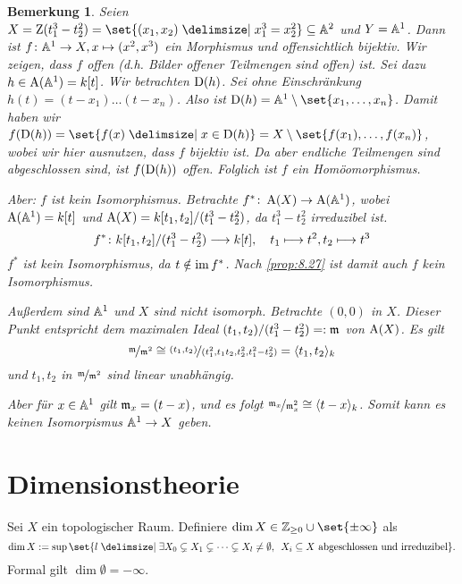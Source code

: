 \documentclass[12pt,a4paper]{scrartcl}
\theoremstyle{cplain}
\theoremstyle{cdef}
\newtheorem{beme}[thmcounter]{Bemerkung}
\begin{document}
\begin{beme}
	Seien $X = \Z(t_1^3-t_2^2) = \set{(x_1,x_2)\given x_1^3 = x_2^2}\subseteq \IA^2$ und $Y = \mathbb A^1$. Dann ist $f\colon \mathbb A^1\to X, x\mapsto (x^2, x^3)$ ein Morphismus und offensichtlich bijektiv. Wir zeigen, dass $f$ offen (d.h. Bilder offener Teilmengen sind offen) ist. Sei dazu $h\in \operatorname{A}(\mathbb A^1) = k[t]$. Wir betrachten $\operatorname{D}(h)$. Sei ohne Einschränkung $h(t) = (t-x_1)\dots (t-x_n)$. Also ist $\D(h) = \IA^1\setminus\set{x_1,\dots, x_n}$. Damit haben wir $f(\D(h)) = \set{f(x)\given x\in \D(h)} = X\setminus\set{f(x_1),\dots, f(x_n)}$, wobei wir hier ausnutzen, dass $f$ bijektiv ist. Da aber endliche Teilmengen sind abgeschlossen sind, ist $f(\operatorname{D}(h))$ offen. Folglich ist $f$ ein Homöomorphismus.
	
	Aber: $f$ ist kein Isomorphismus. Betrachte $f^*\colon \operatorname{A}(X)\to \operatorname{A}(\mathbb A^1)$, wobei $\operatorname{A}(\mathbb A^1) = k[t]$ und $\operatorname{A}(X) = k[t_1,t_2]/(t_1^3-t_2^2)$, da $t_1^3-t_2^2$ irreduzibel ist.
	\[f^*\colon k[t_1,t_2]/(t_1^3-t_2^2) \longrightarrow k[t],\quad t_1\longmapsto t^2, t_2\longmapsto t^3\]
	$f^*$ ist kein Isomorphismus, da $t\notin \operatorname{im} f^*$. Nach \cref{prop:8.27} ist damit auch $f$ kein Isomorphismus.
	
	Außerdem sind $\mathbb A^1$ und $X$ sind nicht isomorph. Betrachte $(0,0)$ in $X$. Dieser Punkt entspricht dem maximalen Ideal $(t_1,t_2)/(t_1^3-t_2^2) =: \mathfrak{m}$ von $\operatorname{A}(X)$. Es gilt
	\[\nicefrac{\mathfrak{m}}{\mathfrak{m}^2} \cong \nicefrac{(t_1,t_2)}{(t_1^2, t_1t_2, t_2^2, t_1^2-t_2^2)} = \langle t_1,t_2\rangle_k \]
	und $t_1, t_2$ in $\nicefrac{\mathfrak{m}}{\mathfrak{m}^2}$ sind linear unabhängig.
	
	Aber für $x\in\mathbb A^1$ gilt $\mathfrak{m}_x = (t-x)$, und es folgt $\nicefrac{\mathfrak{m}_x}{\mathfrak{m}_x^2}\cong \langle t-x\rangle_k$. Somit kann es keinen Isomorpismus $\mathbb A^1\to X$ geben.
\end{beme}

\section{Dimensionstheorie}
\begin{defi}
	Sei $X$ ein topologischer Raum. Definiere $\dim X \in \IZ_{\ge 0}\cup \set{\pm \infty}$ als 
	\[\dim X := \sup \set{l\given \exists X_0\subsetneq X_1\subsetneq\dots \subsetneq X_l \neq \emptyset,\enspace X_i\subseteq X\text{ abgeschlossen und irreduzibel}}.\]
	Formal gilt $\dim\emptyset = -\infty$.
\end{defi}

\medskip
\end{document}

